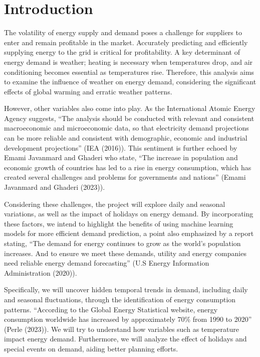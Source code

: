 \documentclass[mstat,12pt]{unswthesis}
\begin{document}



\hypertarget{s-introduction}{%
\chapter{Introduction}\label{s-introduction}}

The volatility of energy supply and demand poses a challenge for
suppliers to enter and remain profitable in the market. Accurately
predicting and efficiently supplying energy to the grid is critical for
profitability. A key determinant of energy demand is weather; heating is
necessary when temperatures drop, and air conditioning becomes essential
as temperatures rise. Therefore, this analysis aims to examine the
influence of weather on energy demand, considering the significant
effects of global warming and erratic weather patterns.

However, other variables also come into play. As the International
Atomic Energy Agency suggests, ``The analysis should be conducted with
relevant and consistent macroeconomic and microeconomic data, so that
electricity demand projections can be more reliable and consistent with
demographic, economic and industrial development projections'' (IEA
(2016)). This sentiment is further echoed by Emami Javanmard and Ghaderi
who state, ``The increase in population and economic growth of countries
has led to a rise in energy consumption, which has created several
challenges and problems for governments and nations'' (Emami Javanmard
and Ghaderi (2023)).

Considering these challenges, the project will explore daily and
seasonal variations, as well as the impact of holidays on energy demand.
By incorporating these factors, we intend to highlight the benefits of
using machine learning models for more efficient demand prediction, a
point also emphasized by a report stating, ``The demand for energy
continues to grow as the world's population increases. And to ensure we
meet these demands, utility and energy companies need reliable energy
demand forecasting'' (U.S Energy Information Administration (2020)).

Specifically, we will uncover hidden temporal trends in demand,
including daily and seasonal fluctuations, through the identification of
energy consumption patterns. ``According to the Global Energy
Statistical website, energy consumption worldwide has increased by
approximately 70\% from 1990 to 2020'' (Perle (2023)). We will try to
understand how variables such as temperature impact energy demand.
Furthermore, we will analyze the effect of holidays and special events
on demand, aiding better planning efforts.
\end{document}
